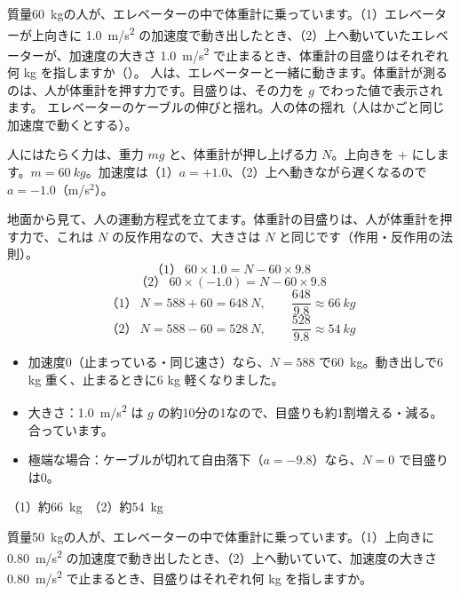 \begin{phreidai}[エレベーターの中の体重計]
\label{ph:力-2:ex1}質量\qty{60}{kg}の人が、エレベーターの中で体重計に乗っています。（1）エレベーターが上向きに \qty{1.0}{m/s^2} の加速度で動き出したとき、（2）上へ動いていたエレベーターが、加速度の大きさ \qty{1.0}{m/s^2} で止まるとき、体重計の目盛りはそれぞれ何 kg を指しますか（\bkhatenaref）。
\phbamen
人は、エレベーターと一緒に動きます。体重計が測るのは、人が体重計を押す力です。目盛りは、その力を $g$ でわった値で表示されます。
\phmushi
エレベーターのケーブルの伸びと揺れ。人の体の揺れ（人はかごと同じ加速度で動くとする）。
\phzu
\noindent\begin{minipage}[c]{0.3\linewidth}\centering
{}
\end{minipage}\hfill
\begin{minipage}[c]{0.67\linewidth}
人にはたらく力は、重力 $mg$ と、体重計が押し上げる力 $N$。上向きを $+$ にします。$m=\qty{60}{kg}$。加速度は（1）$a=+1.0$、（2）上へ動きながら遅くなるので $a=-1.0$（m/s$^2$）。
\end{minipage}
\phriyu
地面から見て、人の運動方程式を立てます。体重計の目盛りは、人が体重計を押す力で、これは $N$ の反作用なので、大きさは $N$ と同じです（作用・反作用の法則）。
\phtateru
\[ \text{（1）}\ 60\times1.0=N-60\times9.8 \]
\[ \text{（2）}\ 60\times(-1.0)=N-60\times9.8 \]
\phtoku
\[ \text{（1）}\ N=588+60=\qty{648}{N},\qquad \frac{648}{9.8}\approx\qty{66}{kg} \]
\[ \text{（2）}\ N=588-60=\qty{528}{N},\qquad \frac{528}{9.8}\approx\qty{54}{kg} \]
\phtashikame
\begin{itemize}[leftmargin=1.2\zw, itemsep=1pt, topsep=1pt, label={\color{bkTheme}●}]
\item 加速度0（止まっている・同じ速さ）なら、$N=588$ で\qty{60}{kg}。動き出しで6 kg 重く、止まるときに6 kg 軽くなりました。
\item 大きさ：\qty{1.0}{m/s^2} は $g$ の約10分の1なので、目盛りも約1割増える・減る。合っています。
\item 極端な場合：ケーブルが切れて自由落下（$a=-9.8$）なら、$N=0$ で目盛りは0。
\end{itemize}
\kotae （1）約\qty{66}{kg}　（2）約\qty{54}{kg}
\end{phreidai}
\begin{jibun}
質量\qty{50}{kg}の人が、エレベーターの中で体重計に乗っています。（1）上向きに \qty{0.80}{m/s^2} の加速度で動き出したとき、（2）上へ動いていて、加速度の大きさ \qty{0.80}{m/s^2} で止まるとき、目盛りはそれぞれ何 kg を指しますか。
\end{jibun}

